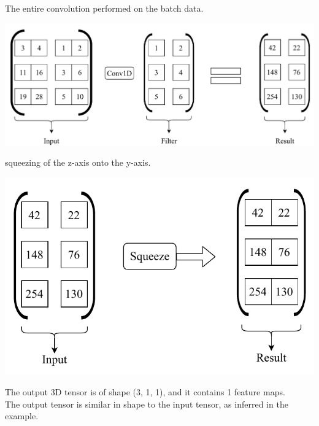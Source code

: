 \documentclass[a4paper, 12pt]{report}
\newcommand\tab[1][1cm]{\hspace*{#1}}
\begin{document}
\begin{blockfigure}{The entire convolution performed on the batch data.}
	\begin{center}
		\includegraphics[width = \textwidth]{secondConvSample_final}
	\end{center}
\end{blockfigure}
\vspace{40pt}
\begin{blockfigure}{squeezing of the z-axis onto the y-axis.}
	\begin{center}
		\includegraphics[width = \textwidth]{squeeze}
	\end{center}
\end{blockfigure}
\vspace{40pt}
\tab The output 3D tensor is of shape (3, 1, 1), and it contains 1 feature maps.\\
\tab The output tensor is similar in shape to the input tensor, as inferred in the example.
\newpage
\end{document}

